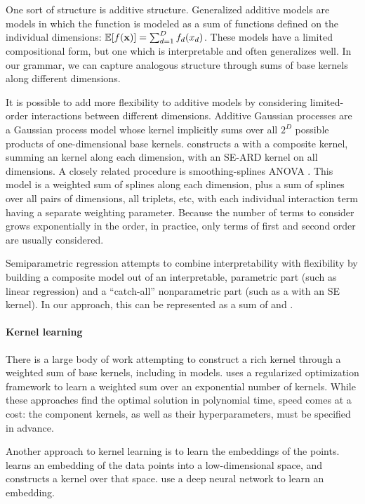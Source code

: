 \documentclass[twoside]{article}
\begin{document}
One sort of structure is additive structure. Generalized additive models \cite{hastie1990generalized} are models in which the function is modeled as a sum of functions defined on the individual dimensions: $\mathbb{E}[f({\bf{x}})] = \sum_{d=1}^D f_d(x_d)$. These models have a limited compositional form, but one which is interpretable and often generalizes well. In our grammar, we can capture analogous structure through sums of base kernels along different dimensions.

It is possible to add more flexibility to additive models by considering limited-order interactions between different dimensions. 
Additive Gaussian processes \cite{duvenaud2011additive11} are a Gaussian process model whose kernel implicitly sums over all $2^D$ possible products of one-dimensional base kernels.  
\cite{plate1999accuracy} constructs a \gp{} with a composite kernel, summing an \kSE{} kernel along each dimension, with an SE-ARD kernel on all dimensions.
A closely related procedure is smoothing-splines ANOVA \cite{wahba1990spline, gu2002smoothing}.
This model is a weighted sum of splines along each dimension, plus a sum of splines over all pairs of dimensions, all triplets, etc, with each individual interaction term having a separate weighting parameter.
Because the number of terms to consider grows exponentially in the order, in practice, only terms of first and second order are usually considered.

Semiparametric regression  attempts to combine interpretability with flexibility by building  a composite model out of an interpretable, parametric part (such as linear regression) and a ``catch-all'' nonparametric part (such as a \gp{} with an SE kernel).
In our approach, this can be represented as a sum of \kSE{} and \kLin{}.

\paragraph{Kernel learning}
There is a large body of work attempting to construct a rich kernel through a weighted sum of base kernels, including in \gp{} models.  
\cite{christoudias2009bayesian}
\cite{Bach_HKL} uses a regularized optimization framework to learn a weighted sum over an exponential number of kernels.
While these approaches find the optimal solution in polynomial time, speed comes at a cost: the component kernels, as well as their hyperparameters, must be specified in advance.

Another approach to kernel learning is to learn the embeddings of the points. 
 learns an embedding of the data points into a low-dimensional space, and constructs a kernel over that space. 
\citet{salakhutdinov2008using} use a deep neural network to learn an embedding. 
\end{document}
